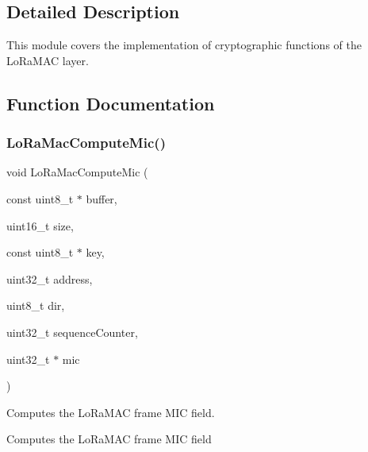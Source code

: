 \subsection{Detailed Description}
This module covers the implementation of cryptographic functions of the Lo\+Ra\+M\+AC layer. 

\subsection{Function Documentation}
\mbox{\label{group___l_o_r_a_m_a_c___c_r_y_p_t_o_ga6ee265070494b83255e7fdc4dff985da}} 
\subsubsection{\texorpdfstring{Lo\+Ra\+Mac\+Compute\+Mic()}{LoRaMacComputeMic()}}
{\footnotesize\ttfamily void Lo\+Ra\+Mac\+Compute\+Mic (\begin{DoxyParamCaption}\item[{const uint8\+\_\+t $\ast$}]{buffer,  }\item[{uint16\+\_\+t}]{size,  }\item[{const uint8\+\_\+t $\ast$}]{key,  }\item[{uint32\+\_\+t}]{address,  }\item[{uint8\+\_\+t}]{dir,  }\item[{uint32\+\_\+t}]{sequence\+Counter,  }\item[{uint32\+\_\+t $\ast$}]{mic }\end{DoxyParamCaption})}



Computes the Lo\+Ra\+M\+AC frame M\+IC field. 

Computes the Lo\+Ra\+M\+AC frame M\+IC field


